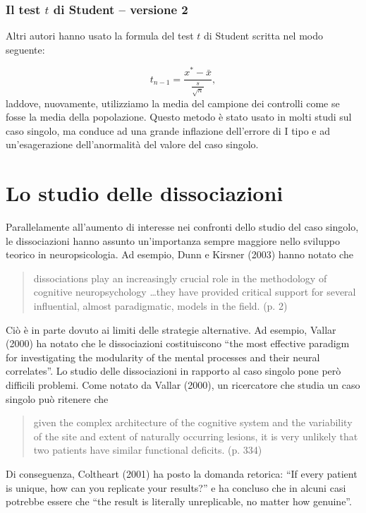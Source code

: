 \subsubsection{Il test $t$ di Student -- versione 2}

Altri autori hanno usato la formula del test $t$ di Student scritta nel modo seguente:

\begin{equation}
t_{n-1} = \frac{x^* - \bar{x}}{\frac{s}{\sqrt{n}}},
\label{eq:ttest_v2}
\end{equation}
laddove, nuovamente, utilizziamo la media del campione dei controlli come se fosse la media della popolazione.
Questo metodo è stato usato in molti studi sul caso singolo, ma conduce ad una grande inflazione dell'errore di I tipo e ad un'esagerazione dell'anormalità del valore del caso singolo.


\section{Lo studio delle dissociazioni}

Parallelamente all'aumento di interesse nei confronti dello studio del caso singolo, le dissociazioni hanno assunto un'importanza sempre maggiore nello sviluppo teorico in neuropsicologia. 
Ad esempio, Dunn e Kirsner (2003) hanno notato che 
\begin{quote}
dissociations play an increasingly crucial role in the methodology of cognitive neuropsychology \dots they have provided critical support for several influential, almost paradigmatic, models in the field. (p. 2)
\end{quote}
Ciò è in parte dovuto ai limiti delle strategie alternative. 
Ad esempio, Vallar (2000) ha notato che le dissociazioni costituiscono ``the most effective paradigm for investigating the modularity of the mental processes and their neural correlates''.
Lo studio delle dissociazioni in rapporto al caso singolo pone però difficili problemi.
Come notato da Vallar (2000), un ricercatore che studia un caso singolo può ritenere che 
\begin{quote}
given the complex architecture of the cognitive system and the variability of the site and extent of naturally occurring lesions, it is very unlikely that two patients have similar functional deficits. (p. 334)
\end{quote}
Di conseguenza, Coltheart (2001) ha posto la domanda retorica: 
``If every patient is unique, how can you replicate your results?''
e ha concluso che in alcuni casi potrebbe essere che
``the result is literally unreplicable, no matter how genuine''.

